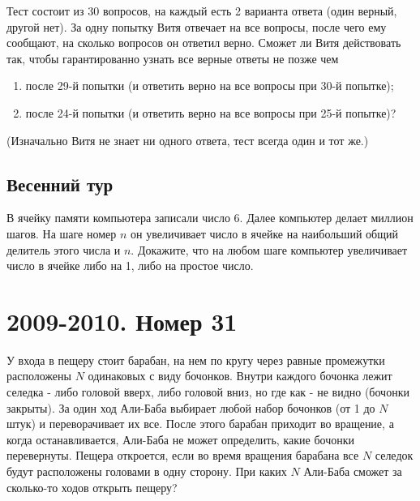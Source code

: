 \documentclass[11pt, a4paper]{common/document_template}
\begin{document}
\begin{exercise}
Тест состоит из 30 вопросов, на каждый есть 2 варианта ответа (один верный, другой нет). За одну попытку Витя отвечает на все вопросы, после чего ему сообщают, на сколько вопросов он ответил верно. Сможет ли Витя действовать так, чтобы гарантированно узнать все верные ответы не позже чем 
\begin{enumerate}
\item после 29-й попытки (и ответить верно на все вопросы при 30-й попытке);
\item после 24-й попытки (и ответить верно на все вопросы при 25-й попытке)?
\end{enumerate}
(Изначально Витя не знает ни одного ответа, тест всегда один и тот же.)
\end{exercise}

\section{Весенний тур}

\begin{exercise}
В ячейку памяти компьютера записали число 6. Далее компьютер делает миллион шагов. На шаге номер $n$ он увеличивает число в ячейке на наибольший общий делитель этого числа и $n$. Докажите, что на любом шаге компьютер увеличивает число в ячейке либо на 1, либо на простое число.
\end{exercise}

\begin{Solution}

\end{Solution}

\chapter{2009-2010. Номер 31}

\begin{exercise}
У входа в пещеру стоит барабан, на нем по кругу через равные промежутки расположены $N$ одинаковых с виду бочонков. Внутри каждого бочонка лежит селедка - либо головой вверх, либо головой вниз, но где как - не видно (бочонки закрыты). За один ход Али-Баба выбирает любой набор бочонков (от 1 до $N$ штук) и переворачивает их все. После этого барабан приходит во вращение, а когда останавливается, Али-Баба не может определить, какие бочонки перевернуты. Пещера откроется, если во время вращения барабана
все $N$ селедок будут расположены головами в одну сторону. При каких $N$ Али-Баба сможет за сколько-то ходов открыть пещеру?
\end{exercise}
\end{document}
